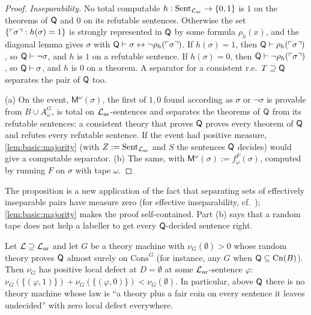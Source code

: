 \begin{proof}
\emph{Inseparability.} No total computable $h:\mathrm{Sent}_{\mathcal{L}_{\mathrm{ar}}}\to\{0,1\}$ is $1$ on the theorems of $\mathsf{Q}$ and $0$ on its refutable sentences. Otherwise the set $\{\ulcorner \sigma\urcorner:h(\sigma)=1\}$ is strongly represented in $\mathsf{Q}$ by some formula $\rho_h(x)$, and the diagonal lemma gives $\sigma$ with $\mathsf{Q}\vdash\sigma\leftrightarrow\neg\rho_h(\ulcorner \sigma\urcorner)$. If $h(\sigma)=1$, then $\mathsf{Q}\vdash\rho_h(\ulcorner \sigma\urcorner)$, so $\mathsf{Q}\vdash\neg\sigma$, and $h$ is $1$ on a refutable sentence. If $h(\sigma)=0$, then $\mathsf{Q}\vdash\neg\rho_h(\ulcorner \sigma\urcorner)$, so $\mathsf{Q}\vdash\sigma$, and $h$ is $0$ on a theorem. A separator for a consistent r.e.\ $T\supseteq\mathsf{Q}$ separates the pair of $\mathsf{Q}$ too.

(a) On the event, $\mathsf M^\omega(\sigma)$, the first of $1,0$ found according as $\sigma$ or $\neg\sigma$ is provable from $B\cup A^G_\omega$, is total on $\mathcal{L}_{\mathrm{ar}}$-sentences and separates the theorems of $\mathsf{Q}$ from its refutable sentences: a consistent theory that proves $\mathsf{Q}$ proves every theorem of $\mathsf{Q}$ and refutes every refutable sentence. If the event had positive measure, \cref{lem:basic:majority} (with $Z:=\mathrm{Sent}_{\mathcal{L}_{\mathrm{ar}}}$ and $S$ the sentences $\mathsf{Q}$ decides) would give a computable separator. (b) The same, with $\mathsf M^\omega(\sigma):=f^F_\omega(\sigma)$, computed by running $F$ on $\sigma$ with tape $\omega$.
\end{proof}

The proposition is a new application of the fact that separating sets of effectively inseparable pairs have measure zero (for effective inseparability, cf.\ \citealp{smullyan1961theory}); \cref{lem:basic:majority} makes the proof self-contained. Part (b) says that a random tape does not help a labeller to get every $\mathsf{Q}$-decided sentence right.

\begin{corollary}\label{cor:basic:localdefect}
Let $\mathcal L\supseteq\mathcal{L}_{\mathrm{ar}}$ and let $G$ be a theory machine with $\nu_G(\emptyset)>0$ whose random theory proves $\mathsf{Q}$ almost surely on $\mathrm{Cons}^G$ (for instance, any $G$ when $\mathsf{Q}\subseteq\mathrm{Cn}(B)$). Then $\nu_G$ has positive local defect at $D=\emptyset$ at some $\mathcal{L}_{\mathrm{ar}}$-sentence $\varphi$: $\nu_G(\{(\varphi,1)\})+\nu_G(\{(\varphi,0)\})<\nu_G(\emptyset)$. In particular, above $\mathsf{Q}$ there is no theory machine whose law is ``a theory plus a fair coin on every sentence it leaves undecided'' with zero local defect everywhere.
\end{corollary}

